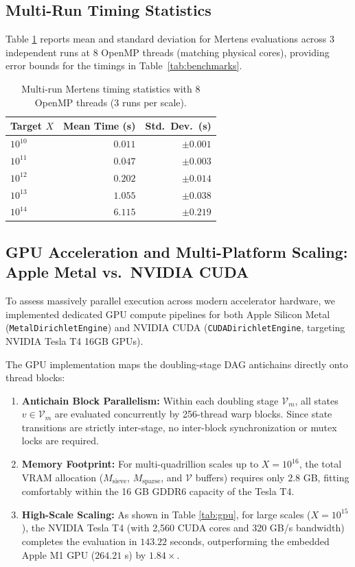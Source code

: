 \documentclass[11pt,a4paper]{article}
\theoremstyle{plain}
\theoremstyle{definition}
\newcommand{\V}{\mathcal{V}}
\begin{document}
\subsection{Multi-Run Timing Statistics}
Table \ref{tab:multirun} reports mean and standard deviation for Mertens evaluations across $3$ independent runs at $8$ OpenMP threads (matching physical cores), providing error bounds for the timings in Table~\ref{tab:benchmarks}.

\begin{table}[htbp]
\centering
\small
\begin{tabular}{@{}lrr@{}}
\toprule
\textbf{Target $X$} & \textbf{Mean Time (s)} & \textbf{Std.\ Dev.\ (s)} \\
\midrule
$10^{10}$ & $0.011$ & $\pm 0.001$ \\
$10^{11}$ & $0.047$ & $\pm 0.003$ \\
$10^{12}$ & $0.202$ & $\pm 0.014$ \\
$10^{13}$ & $1.055$ & $\pm 0.038$ \\
$10^{14}$ & $6.115$ & $\pm 0.219$ \\
\bottomrule
\end{tabular}
\caption{Multi-run Mertens timing statistics with $8$ OpenMP threads ($3$ runs per scale).}
\label{tab:multirun}
\end{table}

\subsection{GPU Acceleration and Multi-Platform Scaling: Apple Metal vs.\ NVIDIA CUDA}
\label{sec:gpu}

To assess massively parallel execution across modern accelerator hardware, we implemented dedicated GPU compute pipelines for both Apple Silicon Metal (\texttt{MetalDirichletEngine}) and NVIDIA CUDA (\texttt{CUDADirichletEngine}, targeting NVIDIA Tesla T4 16GB GPUs).

The GPU implementation maps the doubling-stage DAG antichains directly onto thread blocks:
\begin{enumerate}
    \item \textbf{Antichain Block Parallelism:} Within each doubling stage $\V_m$, all states $v \in \V_m$ are evaluated concurrently by 256-thread warp blocks. Since state transitions are strictly inter-stage, no inter-block synchronization or mutex locks are required.
    \item \textbf{Memory Footprint:} For multi-quadrillion scales up to $X = 10^{16}$, the total VRAM allocation ($M_{\text{sieve}}$, $M_{\text{sparse}}$, and $\V$ buffers) requires only $2.8$ GB, fitting comfortably within the 16 GB GDDR6 capacity of the Tesla T4.
    \item \textbf{High-Scale Scaling:} As shown in Table \ref{tab:gpu}, for large scales ($X = 10^{15}$), the NVIDIA Tesla T4 (with 2,560 CUDA cores and 320 GB/s bandwidth) completes the evaluation in $143.22$ seconds, outperforming the embedded Apple M1 GPU ($264.21$ s) by $1.84\times$.
\end{enumerate}
\end{document}
